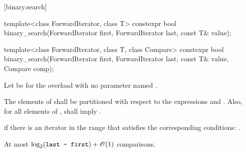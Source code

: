 [binary.search]{}

%
\begin{itemdecl}
template<class ForwardIterator, class T>
  constexpr bool
    binary_search(ForwardIterator first, ForwardIterator last,
                  const T& value);

template<class ForwardIterator, class T, class Compare>
  constexpr bool
    binary_search(ForwardIterator first, ForwardIterator last,
                  const T& value, Compare comp);
\end{itemdecl}

\begin{itemdescr}
\begin{addedblock}
\pnum
Let  be  for the overload with no parameter
named .
\end{addedblock}

\pnum
\requires
The elements
of
shall be partitioned with respect to the expressions
and
.
Also, for all elements
of
\tcode{[first, last)},
shall imply
.

\pnum
\returns
{}
if  there is an iterator
in the range
that satisfies the corresponding conditions:
.

\pnum
\complexity
At most
$\log_2(\texttt{last - first}) + \mathscr{O}(1)$
comparisons.
\end{itemdescr}

